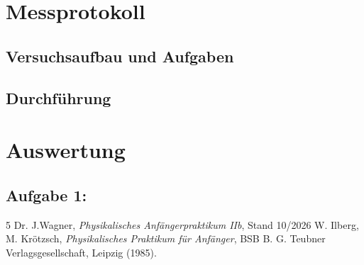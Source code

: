 \documentclass[12pt,a4paper,titlepage]{scrartcl}
\numberwithin{equation}{section}
\numberwithin{table}{section}
\numberwithin{figure}{section}
\begin{document}
\section{Messprotokoll}

\subsection{Versuchsaufbau und Aufgaben}

\subsection{Durchführung}

\section{Auswertung}

\subsection{Aufgabe 1: }




\clearpage

\listoffigures


\listoftables

\begin{thebibliography}{5}
     Dr. J.Wagner, \emph{Physikalisches Anfängerpraktikum IIb}, Stand 10/2026
     W. Ilberg, M. Krötzsch, \emph{Physikalisches Praktikum für Anfänger}, BSB B. G. Teubner Verlagsgesellschaft, Leipzig (1985).
\end{thebibliography}

\end{document}
